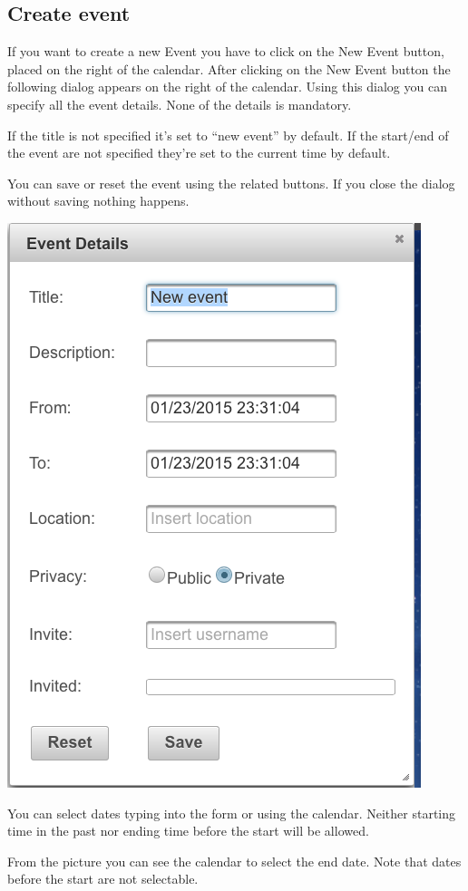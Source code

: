 \documentclass[10pt,a4paper,titlepage]{article}
\begin{document}
\subsection{Create event}
If you want to create a new Event you have to click on the New Event button, placed on the right of the calendar.
After clicking on the New Event button the following dialog appears on the right of the calendar.
Using this dialog you can specify all the event details. None of the details is mandatory. 

If the title is not specified it’s set to “new event” by default. If the start/end of the event are not specified they’re set to the current time by default. 

You can save or reset the event using the related buttons. If you close the dialog without saving nothing happens.

\begin{center}
\includegraphics[width=0.7\linewidth]{./images/09_create_event.png}
\end{center}

You can select dates typing into the form or using the calendar.
Neither starting time in the past nor ending time before the start will be allowed.

From the picture you can see the calendar to select the end date. Note that dates before the start 
are not selectable.
\end{document}
